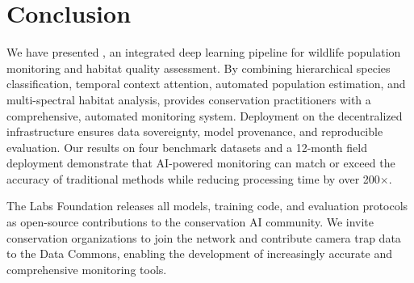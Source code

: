 \section{Conclusion}


We have presented \ConservAI{}, an integrated deep learning pipeline for wildlife population monitoring and habitat quality assessment. By combining hierarchical species classification, temporal context attention, automated population estimation, and multi-spectral habitat analysis, \ConservAI{} provides conservation practitioners with a comprehensive, automated monitoring system. Deployment on the \Zoo{} decentralized infrastructure ensures data sovereignty, model provenance, and reproducible evaluation. Our results on four benchmark datasets and a 12-month field deployment demonstrate that AI-powered monitoring can match or exceed the accuracy of traditional methods while reducing processing time by over 200$\times$.

The \Zoo{} Labs Foundation releases all models, training code, and evaluation protocols as open-source contributions to the conservation AI community. We invite conservation organizations to join the \Zoo{} network and contribute camera trap data to the Data Commons, enabling the development of increasingly accurate and comprehensive monitoring tools.

